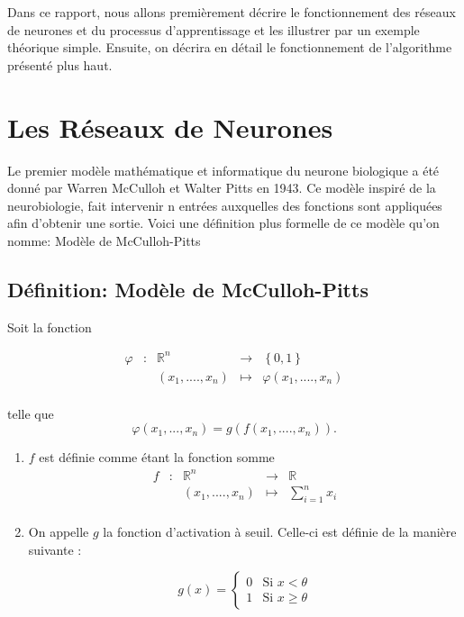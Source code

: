\documentclass{article}
\newcommand{\fonction}[5]{
    \begin{array}{ccccc}
#1 & : & #2 & \to & #3\\
    & & #4 & \mapsto & #5\\ 
    \end{array}
}
\begin{document}
Dans ce rapport, nous allons premièrement décrire le fonctionnement des réseaux de neurones et du processus d'apprentissage et les illustrer par un exemple théorique simple. Ensuite, on décrira en détail le fonctionnement de l'algorithme présenté plus haut.
\newpage

\section{Les Réseaux de Neurones}
Le premier modèle mathématique et informatique du neurone biologique a été donné par Warren McCulloh et Walter Pitts en 1943.
Ce modèle inspiré de la neurobiologie, fait intervenir n entrées auxquelles des fonctions sont appliquées afin d'obtenir une sortie.
Voici une définition plus formelle de ce modèle qu'on nomme: Modèle de McCulloh-Pitts     

\subsection{Définition: Modèle de McCulloh-Pitts}
	Soit la fonction  

	\[\fonction{\varphi}{\mathbb{R}^n}{\left\{0,1\right\}}{(x_1,....,x_n)}{\varphi(x_1,....,x_n)} \]

	telle que  
	\[\varphi (x_1,...,x_n) = g(f(x_1,....,x_n)). \]  

	\begin{enumerate}
		\item $f$ est définie comme étant la fonction somme 
		\[\fonction{f}{\mathbb{R}^n}{\mathbb{R}}{(x_1,....,x_n)}{\sum_{i=1}^{n} {x_i}} \] 
		\item On appelle $g$ la fonction d'activation à seuil. Celle-ci est définie de la manière suivante :

		\[g(x) = \begin{cases} 0 &\mbox{Si } x < \theta \\
				 1 & \mbox{Si } x \geq \theta
	 		 \end{cases} 
		\]
	\end{enumerate}


\vfill
\begin{center}
\end{center}
\vfill
\end{document}
